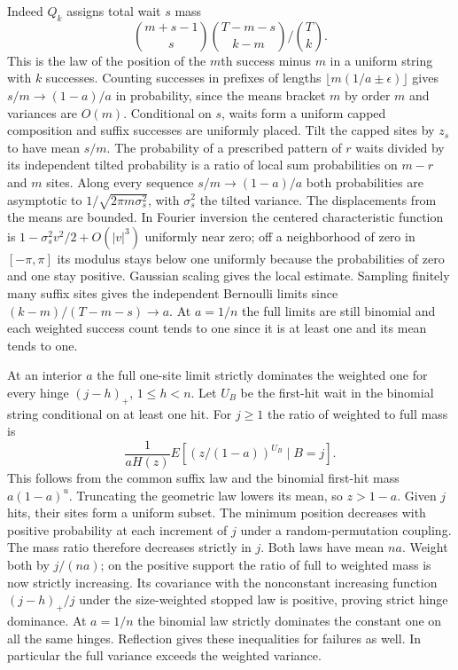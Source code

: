 Indeed $Q_k$ assigns total wait $s$ mass
\[
 \binom{m+s-1}{s}\binom{T-m-s}{k-m}\big/\binom{T}{k}.
\]
This is the law of the position of the $m$th success minus $m$ in a uniform string with $k$ successes. Counting successes in prefixes of lengths $\lfloor m(1/a\pm\epsilon)\rfloor$ gives $s/m\to(1-a)/a$ in probability, since the means bracket $m$ by order $m$ and variances are $O(m)$. Conditional on $s$, waits form a uniform capped composition and suffix successes are uniformly placed. Tilt the capped sites by $z_s$ to have mean $s/m$. The probability of a prescribed pattern of $r$ waits divided by its independent tilted probability is a ratio of local sum probabilities on $m-r$ and $m$ sites. Along every sequence $s/m\to(1-a)/a$ both probabilities are asymptotic to $1/\sqrt{2\pi m\sigma_s^2}$, with $\sigma_s^2$ the tilted variance. The displacements from the means are bounded. In Fourier inversion the centered characteristic function is $1-\sigma_s^2 v^2/2+O(|v|^3)$ uniformly near zero; off a neighborhood of zero in $[-\pi,\pi]$ its modulus stays below one uniformly because the probabilities of zero and one stay positive. Gaussian scaling gives the local estimate. Sampling finitely many suffix sites gives the independent Bernoulli limits since $(k-m)/(T-m-s)\to a$. At $a=1/n$ the full limits are still binomial and each weighted success count tends to one since it is at least one and its mean tends to one.

At an interior $a$ the full one-site limit strictly dominates the weighted one for every hinge $(j-h)_+$, $1\le h<n$. Let $U_B$ be the first-hit wait in the binomial string conditional on at least one hit. For $j\ge1$ the ratio of weighted to full mass is
\[
 \frac{1}{aH(z)}E[(z/(1-a))^{U_B}\mid B=j].
\]
This follows from the common suffix law and the binomial first-hit mass $a(1-a)^u$. Truncating the geometric law lowers its mean, so $z>1-a$. Given $j$ hits, their sites form a uniform subset. The minimum position decreases with positive probability at each increment of $j$ under a random-permutation coupling. The mass ratio therefore decreases strictly in $j$. Both laws have mean $na$. Weight both by $j/(na)$; on the positive support the ratio of full to weighted mass is now strictly increasing. Its covariance with the nonconstant increasing function $(j-h)_+/j$ under the size-weighted stopped law is positive, proving strict hinge dominance. At $a=1/n$ the binomial law strictly dominates the constant one on all the same hinges. Reflection gives these inequalities for failures as well. In particular the full variance exceeds the weighted variance.

